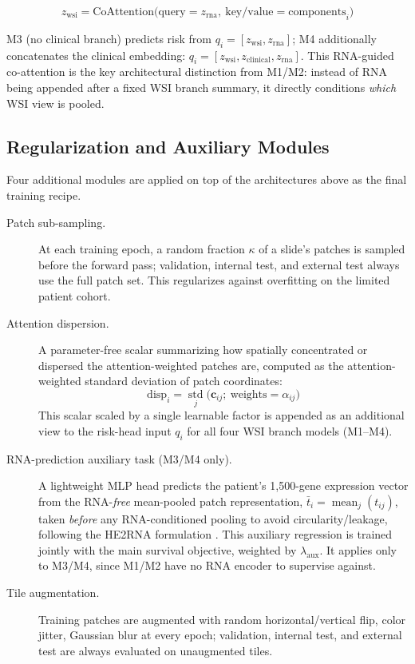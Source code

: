 \begin{equation}
  z_{\mathrm{wsi}} = \mathrm{CoAttention}\big(\text{query}=z_{\mathrm{rna}},\ \text{key/value}=\mathrm{components}_i\big)
\end{equation}

M3 (no clinical branch) predicts risk from $q_i = [z_{\mathrm{wsi}}, z_{\mathrm{rna}}]$;
M4 additionally concatenates the clinical embedding:
$q_i = [z_{\mathrm{wsi}}, z_{\mathrm{clinical}}, z_{\mathrm{rna}}]$. This RNA-guided
co-attention is the key architectural distinction from M1/M2: instead of RNA being
appended after a fixed WSI branch summary, it directly conditions \emph{which}
WSI view is pooled.

\subsection{Regularization and Auxiliary Modules}
\label{subsec:regularization}

Four additional modules are applied on top of the architectures above as the final
training recipe.

\begin{description}
  \item[Patch sub-sampling.] At each training epoch, a random fraction
    $\kappa$ of a slide's patches is sampled before the forward pass; validation,
    internal test, and external test always use the full patch set. This
    regularizes against overfitting on the limited patient cohort.

  \item[Attention dispersion.] A parameter-free scalar summarizing how
    spatially concentrated or dispersed the attention-weighted patches are,
    computed as the attention-weighted standard deviation of patch coordinates:
    \begin{equation}
      \mathrm{disp}_i = \operatorname*{std}_j\big(\mathbf{c}_{ij};\ \text{weights}=\alpha_{ij}\big)
    \end{equation}
    This scalar scaled by a single learnable factor is appended as an additional
    view to the risk-head input $q_i$ for all four WSI branch models (M1--M4).

  \item[RNA-prediction auxiliary task (M3/M4 only).] A lightweight MLP head
    predicts the patient's 1,500-gene expression vector from the RNA-\emph{free}
    mean-pooled patch representation, $\bar{t}_i = \operatorname*{mean}_j(t_{ij})$,
    taken \emph{before} any RNA-conditioned pooling to avoid circularity/leakage,
    following the HE2RNA formulation \cite{schmauch2020he2rna}. This auxiliary
    regression is trained jointly with the main survival objective, weighted by
    $\lambda_{\mathrm{aux}}$. It applies only to M3/M4,
    since M1/M2 have no RNA encoder to supervise against.

  \item[Tile augmentation.] Training patches are augmented with random horizontal/vertical flip, color jitter, Gaussian blur at every epoch; validation, internal test, and external test are always evaluated
    on unaugmented tiles.
\end{description}

